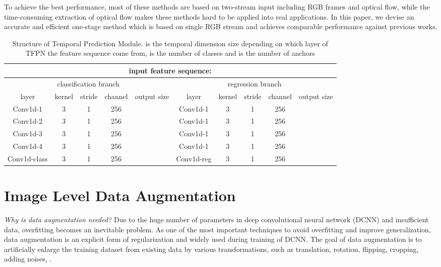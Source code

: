 \documentclass[final]{cvpr}
\begin{document}
To achieve the best performance, most of these methods are based on two-stream input including RGB frames and optical flow, while the time-consuming extraction of optical flow makes these methods hard to be applied into real applications. In this paper, we devise an accurate and efficient one-stage method which is based on single RGB stream and achieves comparable performance against previous works.

\begin{table*}[htbp]
    \caption{Structure of Temporal Prediction Module.  is the temporal dimension size depending on which layer of TFPN the feature sequence come from,  is the number of classes and  is the number of anchors}
    \centering
    \begin{tabular} { c | c c c | c | c | c c c | c }
        \toprule
        \multicolumn{10}{c}{input feature sequence: }\\
        \midrule
        \multicolumn{5}{c|}{classification branch} & \multicolumn{5}{|c}{regression branch}\\
        \midrule
        layer & kernel & stride & channel & output size & layer & kernel & stride & channel & output size \\
        \midrule
        Conv1d-1 & 3 & 1 & 256 &  & Conv1d-1 & 3 & 1 & 256 & \\
        \midrule
        Conv1d-2 & 3 & 1 & 256 &  & Conv1d-1 & 3 & 1 & 256 & \\
        \midrule
        Conv1d-3 & 3 & 1 & 256 &  & Conv1d-1 & 3 & 1 & 256 & \\
        \midrule
        Conv1d-4 & 3 & 1 & 256 &  & Conv1d-1 & 3 & 1 & 256 & \\
        \midrule
        Conv1d-class & 3 & 1 & 256 &  & Conv1d-reg & 3 & 1 & 256 & \\
        \bottomrule
    \end{tabular}
    \label{tab:TPM}
\end{table*}

\section{Image Level Data Augmentation}
\textit{Why is data augmentation needed?} Due to the huge number of parameters in deep convolutional neural network (DCNN) and insufficient data, overfitting becomes an inevitable problem. As one of the most important techniques to avoid overfitting and improve generalization, data augmentation is an explicit form of regularization and widely used during training of DCNN. The goal of data augmentation is to artificially enlarge the training dataset from existing data by various transformations, such as translation, rotation, flipping, cropping, adding noises, \etc. 
\end{document}
